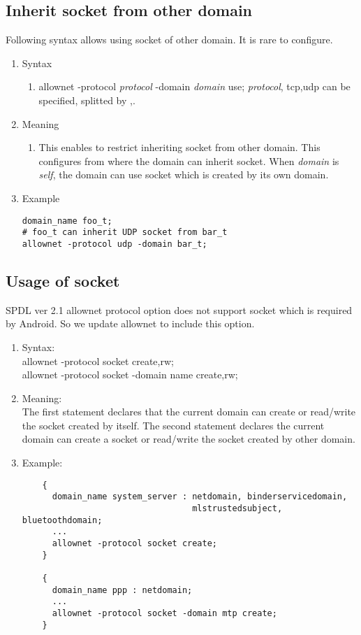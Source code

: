 \documentclass{article}
\begin{document}
\subsection{Inherit socket from other domain}\label{sec:socket}
Following syntax allows using socket of other domain. It is rare to configure.
\begin{enumerate}
 \item  Syntax 
	\begin{enumerate}
	 \item allownet -protocol {\it protocol}  -domain {\it domain} use;
	       {\it protocol}, tcp,udp can be specified, splitted by ,.
	\end{enumerate}

 \item Meaning\\
	\begin{enumerate}
	 \item This enables to restrict inheriting socket from other
	       domain. This configures from where the domain can
	       inherit socket. When {\it domain} is {\it self}, the domain can
	       use socket which is created by its own domain. 
	\end{enumerate}
\item Example
\begin{verbatim}
domain_name foo_t;
# foo_t can inherit UDP socket from bar_t
allownet -protocol udp -domain bar_t; 
\end{verbatim}
\end{enumerate}

\subsection{Usage of socket}
SPDL ver 2.1 allownet protocol option does not support socket which is required 
by Android. So we update allownet to include this option.
\begin{enumerate}
	\item Syntax:\\
	allownet -protocol socket create,rw;\\
	allownet -protocol socket -domain name create,rw;\\
	\item Meaning:\\
	The first statement declares that the current domain can create or 
	read/write the socket created by itself. The second statement declares the 
	current domain can create a socket or read/write the socket created by 
	other domain.
	\item Example:\\
	\begin{verbatim}
	{
	  domain_name system_server : netdomain, binderservicedomain, 
	                              mlstrustedsubject, bluetoothdomain;
	  ...
	  allownet -protocol socket create;
	}
	
	{
	  domain_name ppp : netdomain;
	  ...
	  allownet -protocol socket -domain mtp create;
	}
	\end{verbatim}
\end{enumerate}
\end{document}
